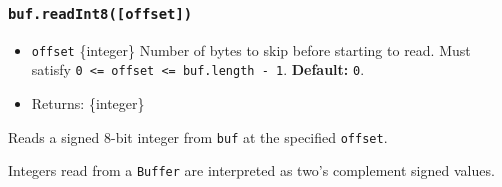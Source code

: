 \begin{Shaded}
\begin{Highlighting}[]
\NormalTok{ \{ }\NormalTok{ \} }\OperatorTok{=} \NormalTok{(}\NormalTok{)}\OperatorTok{;}

\OperatorTok{=} \NormalTok{([}\OperatorTok{,} \OperatorTok{,} \OperatorTok{,} \NormalTok{])}\OperatorTok{;}

\NormalTok{(}\NormalTok{))}\OperatorTok{;}
\NormalTok{(}\NormalTok{))}\OperatorTok{;}
\end{Highlighting}
\end{Shaded}

\subsubsection{\texorpdfstring{\texttt{buf.readInt8({[}offset{]})}}{buf.readInt8({[}offset{]})}}\label{buf.readint8offset}

\begin{itemize}
\tightlist
\item
  \texttt{offset} \{integer\} Number of bytes to skip before starting to
  read. Must satisfy
  \texttt{0\ \textless{}=\ offset\ \textless{}=\ buf.length\ -\ 1}.
  \textbf{Default:} \texttt{0}.
\item
  Returns: \{integer\}
\end{itemize}

Reads a signed 8-bit integer from \texttt{buf} at the specified
\texttt{offset}.

Integers read from a \texttt{Buffer} are interpreted as two's complement
signed values.

